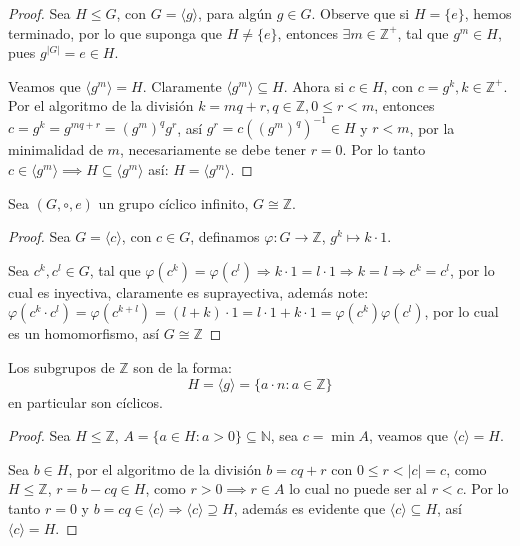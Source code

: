 \begin{proof}
	Sea $H \le G$, con $G = \langle g \rangle$, para algún $g \in G$. Observe que si $H=\{e\}$, hemos terminado, por lo que suponga que $H \neq \{e\}$, entonces $\exists m \in \mathbb{Z}^+$, tal que $g^m \in H$, pues $g^{|G|} = e \in H$.

	Veamos que $\langle g^m \rangle = H$. Claramente $\langle g^m \rangle \subseteq H$. Ahora si $c \in H$, con $c = g^k, k \in \mathbb{Z}^+$. Por el algoritmo de la división $k = mq + r, q \in \mathbb{Z}, 0 \le r < m$, entonces $c = g^k = g^{mq+r} = (g^m)^q g^r$, así $g^r = c ((g^m)^q)^{-1} \in H$ y $r < m$, por la minimalidad de $m$, necesariamente se debe tener $r=0$. Por lo tanto $c \in \langle g^m \rangle \implies H \subseteq \langle g^m \rangle$ así: $H = \langle g^m \rangle$.
\end{proof}

\begin{prop}
	Sea $(G, \circ, e)$ un grupo cíclico infinito, $G \cong \mathbb{Z}$.
\end{prop}

\begin{proof}
	Sea $G = \langle c \rangle$, con $c \in G$, definamos $\varphi: G \to \mathbb{Z}$, $g^k \mapsto k \cdot 1$.

	Sea $c^k, c^l \in G$, tal que $\varphi(c^k) = \varphi(c^l) \Rightarrow k \cdot 1 = l \cdot 1 \Rightarrow k=l \Rightarrow c^k = c^l$, por lo cual es inyectiva, claramente es suprayectiva, además note:
	$\varphi(c^k \cdot c^l) = \varphi(c^{k+l}) = (l+k) \cdot 1 = l \cdot 1 + k \cdot 1 = \varphi(c^k) \varphi(c^l)$, por lo cual es un homomorfismo, así
	$G \cong \mathbb{Z}$
\end{proof}

\begin{eje}
	Los subgrupos de $\mathbb{Z}$ son de la forma:
	\begin{equation*}
		H = \langle g \rangle = \{ a \cdot n : a \in \mathbb{Z} \}
	\end{equation*}
	en particular son cíclicos.
\end{eje}

\begin{proof}
	Sea $H \le \mathbb{Z}$, $A = \{ a \in H : a > 0 \} \subseteq \mathbb{N}$, sea $c = \min A$, veamos que $\langle c \rangle = H$.

	Sea $b \in H$, por el algoritmo de la división $b = cq + r$ con $0 \le r < |c| = c$, como $H \le \mathbb{Z}$, $r = b - cq \in H$, como $r > 0 \implies r \in A$ lo cual no puede ser al $r < c$. Por lo tanto $r=0$ y $b = cq \in \langle c \rangle \Rightarrow \langle c \rangle \supseteq H$, además es evidente que $\langle c \rangle \subseteq H$, así $\langle c \rangle = H$.
\end{proof}

